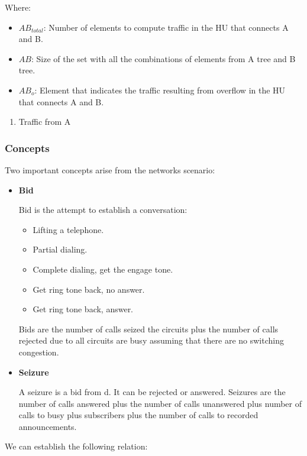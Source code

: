 \documentclass[
	12pt,
	twoside
]{book}
\begin{document}
Where:

\begin{itemize}
	\item $AB_{total}$: Number of elements to compute traffic in the HU that connects A and B.
	\item $AB$: Size of the set with all the combinations of elements from A tree and B tree.
	\item $AB_o$: Element that indicates the traffic resulting from overflow in the HU that connects A and B.
\end{itemize}

\begin{enumerate}
	\item {
		Traffic from A
	}
\end{enumerate}

\subsubsection{Concepts}

Two important concepts arise from the networks scenario:

\begin{itemize}
	\item {
		\textbf{Bid}

		Bid is the attempt to establish a conversation:

		\begin{itemize}
			\item Lifting a telephone.
			\item Partial dialing.
			\item Complete dialing, get the engage tone.
			\item Get ring tone back, no answer.
			\item Get ring tone back, answer.
		\end{itemize}

		Bids are the number of calls seized the circuits plus the number of calls rejected due to all circuits are busy assuming that there are no switching congestion.
	}
	\item {
		\textbf{Seizure}

		A seizure is a bid from d. It can be rejected or answered. Seizures are the number of calls answered plus the number of calls unanswered plus number of calls to busy plus subscribers plus the number of calls to recorded announcements.
	}
\end{itemize}

We can establish the following relation:
\end{document}
